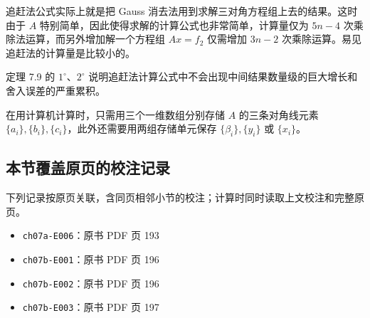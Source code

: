 \documentclass[
  10pt,
  fontset=fandol]{ctexart}
\providecommand{\tightlist}{%
  \setlength{\itemsep}{0pt}\setlength{\parskip}{0pt}}
\begin{document}
追赶法公式实际上就是把 Gauss 消去法用到求解三对角方程组上去的结果。这时由于 \(A\) 特别简单，因此使得求解的计算公式也非常简单，计算量仅为 \(5n-4\) 次乘除法运算，而另外增加解一个方程组 \(Ax=f_2\) 仅需增加 \(3n-2\) 次乘除运算。易见追赶法的计算量是比较小的。

定理 7.9 的 \(1^\circ\)、\(2^\circ\) 说明追赶法计算公式中不会出现中间结果数量级的巨大增长和舍入误差的严重累积。

在用计算机计算时，只需用三个一维数组分别存储 \(A\) 的三条对角线元素 \(\{a_i\},\{b_i\},\{c_i\}\)，此外还需要用两组存储单元保存 \(\{\beta_i\},\{y_i\}\) 或 \(\{x_i\}\)。

\subsection{本节覆盖原页的校注记录}\label{ux672cux8282ux8986ux76d6ux539fux9875ux7684ux6821ux6ce8ux8bb0ux5f55}

下列记录按原页关联，含同页相邻小节的校注；计算时同时读取上文校注和完整原页。

\begin{itemize}
\tightlist
\item
  \texttt{ch07a-E006}：原书 PDF 页 193
\item
  \texttt{ch07b-E001}：原书 PDF 页 196
\item
  \texttt{ch07b-E002}：原书 PDF 页 196
\item
  \texttt{ch07b-E003}：原书 PDF 页 197
\end{itemize}
\end{document}
